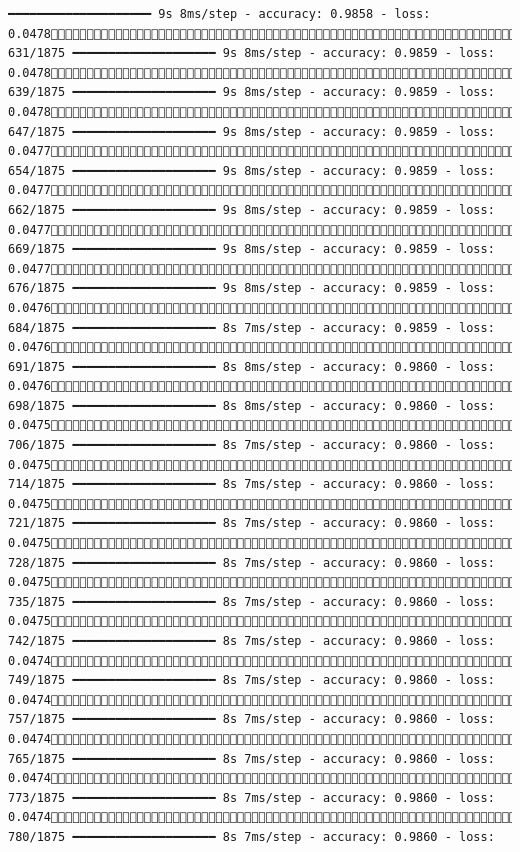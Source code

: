 \documentclass[
  letterpaper,
  DIV=11,
  numbers=noendperiod]{scrreprt}
\begin{document}
\begin{verbatim}
━━━━━━━━━━━━━━━━━━━━ 9s 8ms/step - accuracy: 0.9858 - loss: 0.0478 631/1875 ━━━━━━━━━━━━━━━━━━━━ 9s 8ms/step - accuracy: 0.9859 - loss: 0.0478 639/1875 ━━━━━━━━━━━━━━━━━━━━ 9s 8ms/step - accuracy: 0.9859 - loss: 0.0478 647/1875 ━━━━━━━━━━━━━━━━━━━━ 9s 8ms/step - accuracy: 0.9859 - loss: 0.0477 654/1875 ━━━━━━━━━━━━━━━━━━━━ 9s 8ms/step - accuracy: 0.9859 - loss: 0.0477 662/1875 ━━━━━━━━━━━━━━━━━━━━ 9s 8ms/step - accuracy: 0.9859 - loss: 0.0477 669/1875 ━━━━━━━━━━━━━━━━━━━━ 9s 8ms/step - accuracy: 0.9859 - loss: 0.0477 676/1875 ━━━━━━━━━━━━━━━━━━━━ 9s 8ms/step - accuracy: 0.9859 - loss: 0.0476 684/1875 ━━━━━━━━━━━━━━━━━━━━ 8s 7ms/step - accuracy: 0.9859 - loss: 0.0476 691/1875 ━━━━━━━━━━━━━━━━━━━━ 8s 8ms/step - accuracy: 0.9860 - loss: 0.0476 698/1875 ━━━━━━━━━━━━━━━━━━━━ 8s 8ms/step - accuracy: 0.9860 - loss: 0.0475 706/1875 ━━━━━━━━━━━━━━━━━━━━ 8s 7ms/step - accuracy: 0.9860 - loss: 0.0475 714/1875 ━━━━━━━━━━━━━━━━━━━━ 8s 7ms/step - accuracy: 0.9860 - loss: 0.0475 721/1875 ━━━━━━━━━━━━━━━━━━━━ 8s 7ms/step - accuracy: 0.9860 - loss: 0.0475 728/1875 ━━━━━━━━━━━━━━━━━━━━ 8s 7ms/step - accuracy: 0.9860 - loss: 0.0475 735/1875 ━━━━━━━━━━━━━━━━━━━━ 8s 7ms/step - accuracy: 0.9860 - loss: 0.0475 742/1875 ━━━━━━━━━━━━━━━━━━━━ 8s 7ms/step - accuracy: 0.9860 - loss: 0.0474 749/1875 ━━━━━━━━━━━━━━━━━━━━ 8s 7ms/step - accuracy: 0.9860 - loss: 0.0474 757/1875 ━━━━━━━━━━━━━━━━━━━━ 8s 7ms/step - accuracy: 0.9860 - loss: 0.0474 765/1875 ━━━━━━━━━━━━━━━━━━━━ 8s 7ms/step - accuracy: 0.9860 - loss: 0.0474 773/1875 ━━━━━━━━━━━━━━━━━━━━ 8s 7ms/step - accuracy: 0.9860 - loss: 0.0474 780/1875 ━━━━━━━━━━━━━━━━━━━━ 8s 7ms/step - accuracy: 0.9860 - loss: 
\end{verbatim}
\end{document}
